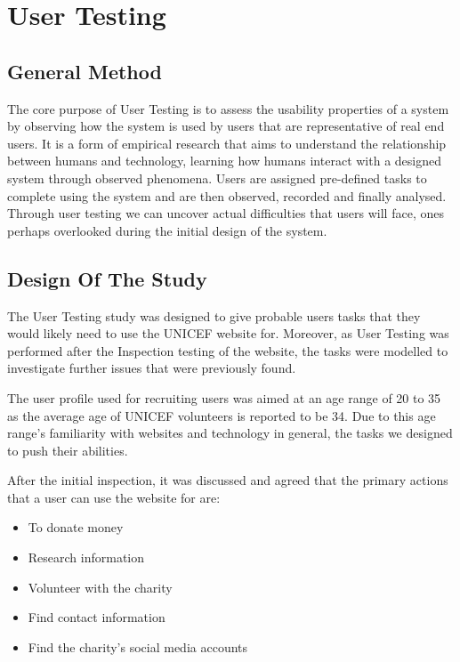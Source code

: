 \section*{User Testing}

\subsection{General Method}
The core purpose of User Testing is to assess the usability properties of a system by observing how the system is used by users that are representative of real end users. It is a form of empirical research that aims to understand the relationship between humans and technology, learning how humans interact with a designed system through observed phenomena. 
Users are assigned pre-defined tasks to complete using the system and are then observed, recorded and finally analysed. 
Through user testing we can uncover actual difficulties that users will face, ones perhaps overlooked during the initial design of the system.

\subsection{Design Of The Study}
The User Testing study was designed to give probable users tasks that they would likely need to use the UNICEF website for. Moreover, as User Testing was performed after the Inspection testing of the website, the tasks were modelled to investigate further issues that were previously found. 

The user profile used for recruiting users was aimed at an age range of 20 to 35 as the average age of UNICEF volunteers is reported to be 34. Due to this age range’s familiarity with websites and technology in general, the tasks we designed to push their abilities.

After the initial inspection, it was discussed and agreed that the primary actions that a user can use the website for are:
\begin{itemize}
    \item To donate money 
    \item Research information
    \item Volunteer with the charity
    \item Find contact information
    \item Find the charity’s social media accounts
  \end{itemize}

